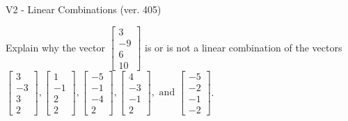\begin{exercise}
  \begin{exerciseTitle}V2 - Linear Combinations (ver. 405)\end{exerciseTitle}
  \begin{exerciseStatement}
    Explain why the vector \(\left[\begin{array}{c}
3 \\
-9 \\
6 \\
10
\end{array}\right]\)  is or is not a linear 
	combination of the vectors \(\left[\begin{array}{c}
3 \\
-3 \\
3 \\
2
\end{array}\right] , \left[\begin{array}{c}
1 \\
-1 \\
2 \\
2
\end{array}\right] , \left[\begin{array}{c}
-5 \\
-1 \\
-4 \\
2
\end{array}\right] , \left[\begin{array}{c}
4 \\
-3 \\
-1 \\
2
\end{array}\right] , \text{ and } \left[\begin{array}{c}
-5 \\
-2 \\
-1 \\
-2
\end{array}\right]\).
	



\end{exerciseStatement}
\end{exercise}
